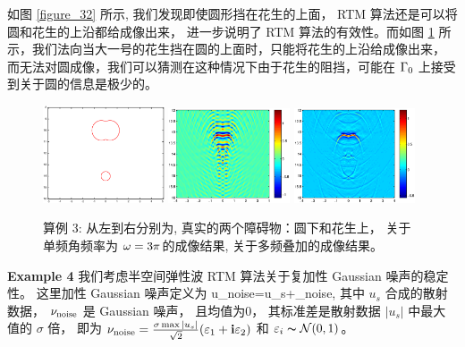 { 如图 \ref{figure_32} 所示, 我们发现即使圆形挡在花生的上面， RTM 算法还是可以将圆和花生的上沿都给成像出来， 进一步说明了 RTM 算法的有效性。而如图 \ref{figure_33} 所示，我们法向当大一号的花生挡在圆的上面时，只能将花生的上沿给成像出来， 而无法对圆成像，我们可以猜测在这种情况下由于花生的阻挡，可能在 $\Gamma_0$ 上接受到关于圆的信息是极少的。
\begin{figure}[htbp]
 	\centering
 	\includegraphics[width=0.32\textwidth,height=0.16\textheight]{./Img/graphic/circle_0_4_peanut_1_profile_reverse.eps}
 	\includegraphics[width=0.32\textwidth]{./Img/graphic/circle_0_4_peanut_1_3pi_down.eps}
 	\includegraphics[width=0.32\textwidth]{./Img/graphic/circle_0_4_peanut_1_multi_down.eps}
 	
 	\caption{算例 3: 从左到右分别为,  真实的两个障碍物：圆下和花生上， 关于单频角频率为 $\omega=3\pi$的成像结果, 关于多频叠加的成像结果。}\label{figure_33}
 \end{figure}
 
\bigskip
\textbf{Example 4}
我们考虑半空间弹性波 RTM 算法关于复加性 Gaussian 噪声的稳定性。 这里加性 Gaussian 噪声定义为 
\ben
u_{\rm noise}=u_s+\nu_{\rm noise},
\een
其中 $u_s$ 合成的散射数据， $\nu_{\rm noise}$ 是 Gaussian 噪声， 且均值为0， 其标准差是散射数据 $|u_s|$ 中最大值的 $\sigma$ 倍， 即为 $\nu_{\rm noise}=\frac{\sigma \max |u_s|}{\sqrt{2}}(\varepsilon_1+\mathbf{i}\varepsilon_2)$ 和 $\varepsilon_i\thicksim \mathcal{N}(0,1)$。

}

